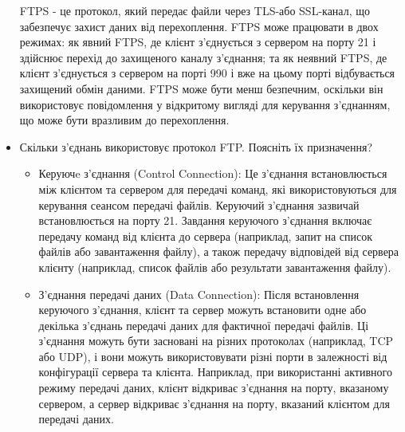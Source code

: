 \documentclass{article}
\begin{document}
\begin{normalsize}
\begin{itemize}
	FTPS - це протокол, який передає файли через TLS-або SSL-канал, що забезпечує захист даних від перехоплення. FTPS може працювати в двох режимах: як явний FTPS, де клієнт з'єднується з сервером на порту 21 і здійснює перехід до захищеного каналу з'єднання; та як неявний FTPS, де клієнт з'єднується з сервером на порті 990 і вже на цьому порті відбувається захищений обмін даними. FTPS може бути менш безпечним, оскільки він використовує повідомлення у відкритому вигляді для керування з'єднанням, що може бути вразливим до перехоплення.
	\item Скільки з’єднань використовує протокол FTP. Поясніть їх
	призначення?
	\begin{itemize}
		\item Керуючe з'єднання (Control Connection): Це з'єднання встановлюється між клієнтом та сервером для передачі команд, які використовуються для керування сеансом передачі файлів. Керуючий з'єднання зазвичай встановлюється на порту 21. Завдання керуючого з'єднання включає передачу команд від клієнта до сервера (наприклад, запит на список файлів або завантаження файлу), а також передачу відповідей від сервера клієнту (наприклад, список файлів або результати завантаження файлу).
		\item З'єднання передачі даних (Data Connection): Після встановлення керуючого з'єднання, клієнт та сервер можуть встановити одне або декілька з'єднань передачі даних для фактичної передачі файлів. Ці з'єднання можуть бути засновані на різних протоколах (наприклад, TCP або UDP), і вони можуть використовувати різні порти в залежності від конфігурації сервера та клієнта. Наприклад, при використанні активного режиму передачі даних, клієнт відкриває з'єднання на порту, вказаному сервером, а сервер відкриває з'єднання на порту, вказаний клієнтом для передачі даних.
	\end{itemize}
\end{itemize}



\end{normalsize}
\end{document}
